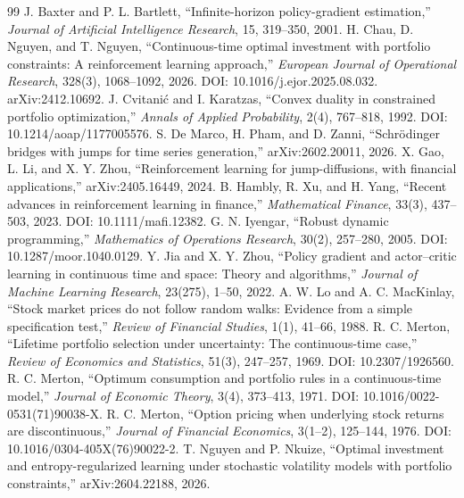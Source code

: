 \documentclass[11pt]{article}
\begin{document}
\begin{thebibliography}{99}
 J. Baxter and P. L. Bartlett, ``Infinite-horizon policy-gradient estimation,'' \emph{Journal of Artificial Intelligence Research}, 15, 319--350, 2001.
 H. Chau, D. Nguyen, and T. Nguyen, ``Continuous-time optimal investment with portfolio constraints: A reinforcement learning approach,'' \emph{European Journal of Operational Research}, 328(3), 1068--1092, 2026. DOI: 10.1016/j.ejor.2025.08.032. arXiv:2412.10692.
 J. Cvitani\'c and I. Karatzas, ``Convex duality in constrained portfolio optimization,'' \emph{Annals of Applied Probability}, 2(4), 767--818, 1992. DOI: 10.1214/aoap/1177005576.
 S. De Marco, H. Pham, and D. Zanni, ``Schr\"odinger bridges with jumps for time series generation,'' arXiv:2602.20011, 2026.
 X. Gao, L. Li, and X. Y. Zhou, ``Reinforcement learning for jump-diffusions, with financial applications,'' arXiv:2405.16449, 2024.
 B. Hambly, R. Xu, and H. Yang, ``Recent advances in reinforcement learning in finance,'' \emph{Mathematical Finance}, 33(3), 437--503, 2023. DOI: 10.1111/mafi.12382.
 G. N. Iyengar, ``Robust dynamic programming,'' \emph{Mathematics of Operations Research}, 30(2), 257--280, 2005. DOI: 10.1287/moor.1040.0129.
 Y. Jia and X. Y. Zhou, ``Policy gradient and actor--critic learning in continuous time and space: Theory and algorithms,'' \emph{Journal of Machine Learning Research}, 23(275), 1--50, 2022.
 A. W. Lo and A. C. MacKinlay, ``Stock market prices do not follow random walks: Evidence from a simple specification test,'' \emph{Review of Financial Studies}, 1(1), 41--66, 1988.
 R. C. Merton, ``Lifetime portfolio selection under uncertainty: The continuous-time case,'' \emph{Review of Economics and Statistics}, 51(3), 247--257, 1969. DOI: 10.2307/1926560.
 R. C. Merton, ``Optimum consumption and portfolio rules in a continuous-time model,'' \emph{Journal of Economic Theory}, 3(4), 373--413, 1971. DOI: 10.1016/0022-0531(71)90038-X.
 R. C. Merton, ``Option pricing when underlying stock returns are discontinuous,'' \emph{Journal of Financial Economics}, 3(1--2), 125--144, 1976. DOI: 10.1016/0304-405X(76)90022-2.
 T. Nguyen and P. Nkuize, ``Optimal investment and entropy-regularized learning under stochastic volatility models with portfolio constraints,'' arXiv:2604.22188, 2026.

\end{thebibliography}
\end{document}
